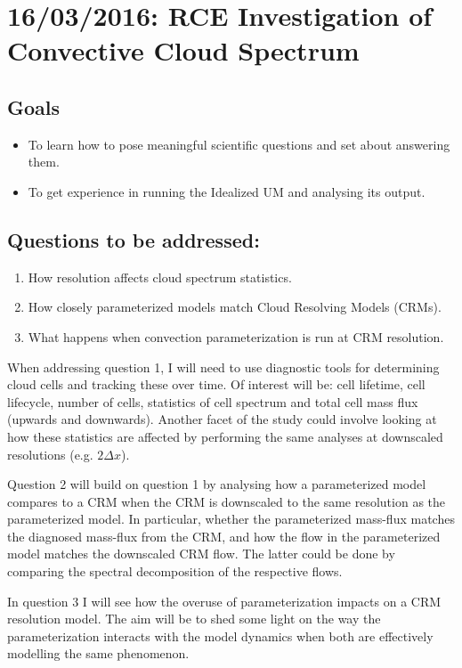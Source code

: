 \documentclass{article}
\begin{document}
\section*{16/03/2016: RCE Investigation of Convective Cloud Spectrum}

\subsection*{Goals}

\begin{itemize}
    \item To learn how to pose meaningful scientific questions and set about answering them.
    \item To get experience in running the Idealized UM and analysing its output.
\end{itemize}

\subsection*{Questions to be addressed:}

\begin{enumerate}
    \item How resolution affects cloud spectrum statistics.
    \item How closely parameterized models match Cloud Resolving Models (CRMs).
    \item What happens when convection parameterization is run at CRM resolution.
\end{enumerate}

When addressing question 1, I will need to use diagnostic tools for determining cloud cells and
tracking these over time. Of interest will be: cell lifetime, cell lifecycle, number of cells,
statistics of cell spectrum and total cell mass flux (upwards and downwards). Another facet of the
study could involve looking at how these statistics are affected by performing the same analyses at
downscaled resolutions (e.g. $2 \Delta x$). 

Question 2 will build on question 1 by analysing how a parameterized model compares to a CRM when
the CRM is downscaled to the same resolution as the parameterized model. In particular, whether the
parameterized mass-flux matches the diagnosed mass-flux from the CRM, and how the flow in the
parameterized model matches the downscaled CRM flow. The latter could be done by comparing the
spectral decomposition of the respective flows.

In question 3 I will see how the overuse of parameterization impacts on a CRM resolution model. The
aim will be to shed some light on the way the parameterization interacts with the model dynamics
when both are effectively modelling the same phenomenon.
\end{document}
